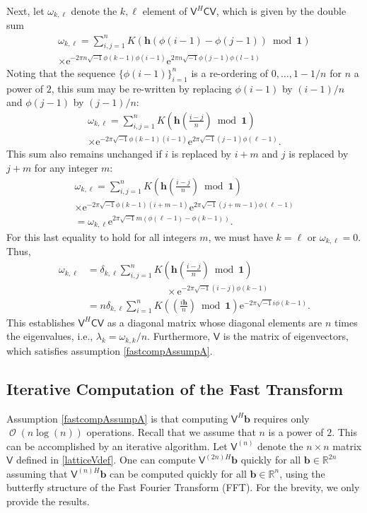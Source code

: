 \documentclass[twocolumn]{svjour3}          %
\DeclareMathOperator{\Order}{{\mathcal O}}
\newcommand{\bm}[1]{\boldsymbol{#1}}
\newcommand{\reals}{\mathbb{R}}
\newcommand{\vb}{\bm{b}}
\newcommand{\vh}{\bm{h}}
\newcommand{\vone}{\bm{1}}
\newcommand{\mC}{\mathsf{C}}
\newcommand{\mV}{\mathsf{V}}
\newcommand{\me}{\mathrm{e}}
\begin{document}
Next, let $\omega_{k, \ell}$ denote the $k,\ell$ element of $\mV^H \mC \mV$, which is given by the double sum
\begin{multline*}
\omega_{k, \ell} = \sum_{i,j=1}^n K(\vh(\phi(i-1) - \phi(j-1)) \bmod \vone ) \\
\times   \me^{-2 \pi n \sqrt{-1} \phi(k-1)\phi(i-1)}  \me^{2 \pi n \sqrt{-1} \phi(j-1)\phi(l-1)}
\end{multline*}
Noting that the sequence $\{\phi(i-1)\}_{i=1}^n$ is a re-ordering of $0, \ldots, 1-1/n$ for $n$ a power of $2$, this sum may be re-written by replacing $\phi(i-1)$ by $(i-1)/n$ and $\phi(j-1)$ by $(j-1)/n$:
\begin{multline*}
\omega_{k, \ell} = \sum_{i,j=1}^n K\left (\vh \left(\frac{i-j}{n} \right) \bmod \vone \right) \\
\times   \me^{-2 \pi \sqrt{-1} \phi(k-1)(i-1)}  \me^{2 \pi \sqrt{-1} (j-1)\phi(\ell-1)}.
\end{multline*}
This sum also remains unchanged if $i$ is replaced by $i+m$ and $j$ is replaced by $j+m$ for any integer $m$:
\begin{multline*}
\omega_{k, \ell} = \sum_{i,j=1}^n K\left (\vh \left(\frac{i-j}{n} \right) \bmod \vone \right) \\
\times   \me^{-2 \pi \sqrt{-1} \phi(k-1)(i+m-1)}  \me^{2 \pi \sqrt{-1} (j+m-1)\phi(\ell-1)} \\
=   \omega_{k, \ell}  \me^{2 \pi \sqrt{-1} m(\phi(\ell-1) - \phi(k-1))}.
\end{multline*}
For this last equality to hold for all integers $m$, we must have $k = \ell$ or $\omega_{k,\ell} = 0$.  Thus, 
\begin{align*}
\omega_{k, \ell} &= \delta_{k,\ell} \sum_{i,j=1}^n K\left (\vh \left(\frac{i-j}{n} \right) \bmod \vone \right) \\
& \qquad \qquad \qquad \qquad \times   \me^{-2 \pi \sqrt{-1} (i - j) \phi(k-1)} \\
& = n \delta_{k,\ell}  \sum_{i=1}^n K\left ( \left(\frac{i\vh}{n} \right) \bmod \vone \right)  \me^{-2 \pi \sqrt{-1} i \phi(k-1) }.
\end{align*}
This establishes $\mV^H \mC \mV$ as a diagonal matrix whose diagonal elements are $n$ times the eigenvalues, i.e., $\lambda_k = \omega_{k,k}/n$.  Furthermore, $\mV$ is the matrix of eigenvectors, which satisfies assumption \eqref{fastcompAssumpA}.
\fi

\subsection{Iterative Computation of the Fast Transform}
Assumption \eqref{fastcompAssumpA} is that computing $\mV^H \vb$ requires only $\Order(n \log(n)) $ operations.  Recall that we assume that $n$ is a power of $2$.  This can be accomplished by an iterative algorithm.  Let $\mV^{(n)}$ denote the $n \times n$ matrix $\mV$ defined in  \eqref{latticeVdef}.  One can compute $\mV^{(2n)H}\vb$ quickly for all $\vb \in \reals^{2n}$ assuming that $\mV^{(n)H}\vb$ can be computed quickly for all $\vb \in \reals^n$, using the butterfly structure of the Fast Fourier Transform (FFT). For the brevity, we only provide the results. 
\end{document}
